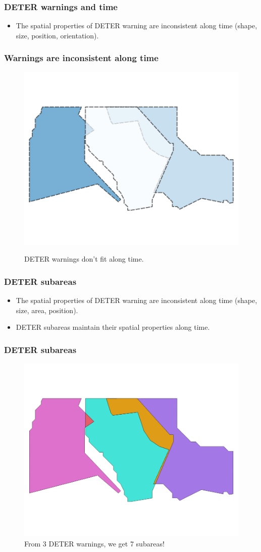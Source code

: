 \documentclass[aspectratio=169]{beamer}
\begin{document}
\begin{frame}
    \frametitle{DETER warnings and time}
    \begin{itemize}
        \item The spatial properties of DETER warning are inconsistent along 
            time (shape, size, position, orientation).
    \end{itemize}
\end{frame}

\begin{frame}
    \frametitle{Warnings are inconsistent along time}
    \begin{figure}[h] 
        \includegraphics[width=0.60\linewidth]
        {./images/sample_deter_warnings.png}
        \label{fig:deter_subareas}
        \caption{DETER warnings don't fit along time.}
    \end{figure}
\end{frame}



\begin{frame}
    \frametitle{DETER subareas}
    \begin{itemize}
        \item The spatial properties of DETER warning are inconsistent along 
            time (shape, size, area, position).
        \item DETER subareas maintain their spatial properties along time.
    \end{itemize}
\end{frame}

\begin{frame}
    \frametitle{DETER subareas}
    \begin{figure}[h] 
        \includegraphics[width=0.60\linewidth]
        {./images/sample_deter_subareas.png}
        \caption{From 3 DETER warnings, we get 7 subareas!}
        \label{fig:deter_subareas}
    \end{figure}
\end{frame}
\end{document}
